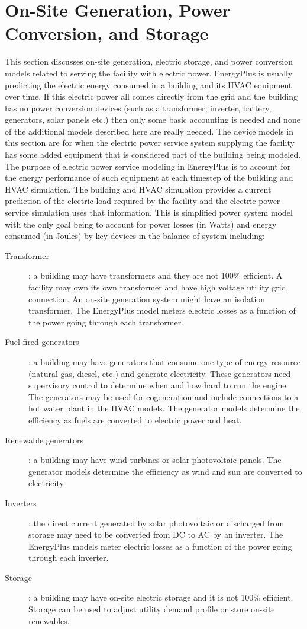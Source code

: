 \chapter{On-Site Generation, Power Conversion, and Storage}\label{on-site-generation}

This section discusses on-site generation, electric storage, and power conversion models related to serving the facility with electric power.  EnergyPlus is usually predicting the electric energy consumed in a building and its HVAC equipment over time.  If this electric power all comes directly from the grid and the building has no power conversion devices (such as a transformer, inverter, battery, generators, solar panels etc.) then only some basic accounting is needed and none of the additional models described here are really needed.  The device models in this section are for when the electric power service system supplying the facility has some added equipment that is considered part of the building being modeled.   The purpose of electric power service modeling in EnergyPlus is to account for the energy performance of such equipment at each timestep of the building and HVAC simulation.  The building and HVAC simulation provides a current prediction of the electric load required by the facility and the electric power service simulation uses that information.   This is simplified power system model with the only goal being to account for power losses (in Watts) and energy consumed (in Joules) by key devices in the balance of system including:

\begin{description}
  \item[Transformer]: a building may have transformers and they are not 100\% efficient. A facility may own its own transformer and have high voltage utility grid connection. An on-site generation system might have an isolation transformer.  The EnergyPlus model meters electric losses as a function of the power going through each transformer.
  \item[Fuel-fired generators]: a building may have generators that consume one type of energy resource (natural gas, diesel, etc.) and generate electricity.  These generators need supervisory control to determine when and how hard to run the engine.  The generators may be used for cogeneration and include connections to a hot water plant in the HVAC models.  The generator models determine the efficiency as fuels are converted to electric power and heat.
  \item[Renewable generators]: a building may have wind turbines or solar photovoltaic panels.  The generator models determine the efficiency as wind and sun are converted to electricity.
  \item[Inverters]: the direct current generated by solar photovoltaic or discharged from storage may need to be converted from DC to AC by an inverter.  The EnergyPlus models meter electric losses as a function of the power going through each inverter.
  \item[Storage]: a building may have on-site electric storage and it is not 100\% efficient.  Storage can be used to adjust utility demand profile or store on-site renewables.
\end{description}

